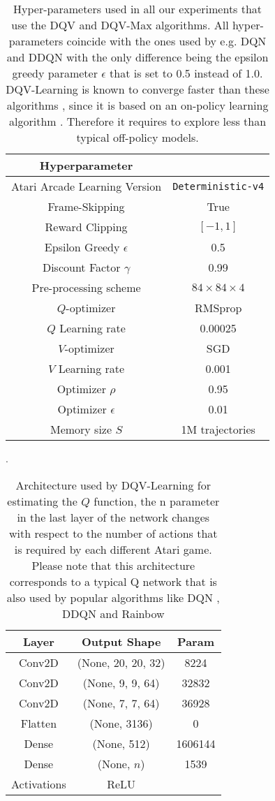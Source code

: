 \begin{table}[ht!]
\centering
\caption{Hyper-parameters used in all our experiments that use the DQV and DQV-Max algorithms. All hyper-parameters coincide with the ones used by e.g. DQN and DDQN with the only difference being the epsilon greedy parameter $\epsilon$ that is set to 0.5 instead of 1.0. DQV-Learning is known to converge faster than these algorithms \cite{sabatelli2018deepqv}, since it is based on an on-policy learning algorithm \cite{wiering2005qv}. Therefore it requires to explore less than typical off-policy models.}
\begin{tabular}{c | c |  }
Hyperparameter \\
\hline \hline
Atari Arcade Learning Version  & \texttt{Deterministic-v4} \\
Frame-Skipping & True \\ 
Reward Clipping & $[-1,1]$ \\ 
Epsilon Greedy $\epsilon$ & 0.5 \\
Discount Factor $\gamma$ & 0.99 \\ 
Pre-processing scheme & $84\times84\times4$ \\ 
$Q$-optimizer & RMSprop \\ 
$Q$ Learning rate & 0.00025 \\ 
$V$-optimizer & SGD \\ 
$V$ Learning rate & 0.001 \\
Optimizer $\rho$ & 0.95 \\ 
Optimizer $\epsilon$ & 0.01 \\ 
Memory size $S$ & 1M trajectories 
\end{tabular}
\label{tab:table_1}
\end{table}

\begin{table}[ht!]
\centering
\caption{Architecture used by DQV-Learning for estimating the $Q$ function, the n parameter in the last layer of the network changes with respect to the number of actions that is required by each different Atari game. Please note that this architecture corresponds to a typical Q network that is also used by popular algorithms like DQN \cite{mnih2015human}, DDQN \cite{van2015deep} and Rainbow \cite{hessel2018rainbow}}.
\begin{tabular}{c | c | c | }
Layer & Output Shape & Param \\
\hline \hline 
Conv2D & (None, 20, 20, 32) & 8224 \\     
Conv2D & (None, 9, 9, 64) & 32832 \\ 
Conv2D & (None, 7, 7, 64)  & 36928 \\ 
Flatten & (None, 3136) & 0 \\
Dense & (None, 512) & 1606144 \\
Dense & (None, $n$) & 1539 \\
Activations & ReLU & \\

\end{tabular}
\label{tab:table_2}
\end{table}

